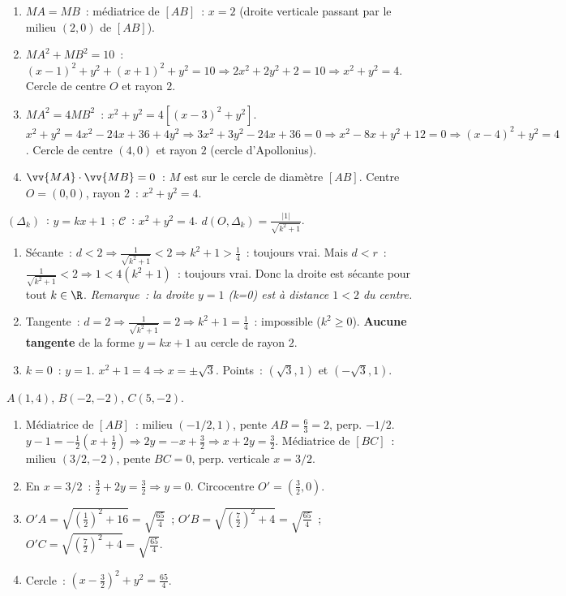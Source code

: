 
\begin{enumerate}
  \item $MA=MB$~: m\'ediatrice de $[AB]$~: $x=2$ (droite verticale passant par le milieu $(2,0)$ de $[AB]$).
  \item $MA^2+MB^2=10$~: $(x-1)^2+y^2+(x+1)^2+y^2=10\Rightarrow2x^2+2y^2+2=10\Rightarrow x^2+y^2=4$.
        Cercle de centre $O$ et rayon $2$.
  \item $MA^2=4MB^2$~: $x^2+y^2=4[(x-3)^2+y^2]$.
        $x^2+y^2=4x^2-24x+36+4y^2\Rightarrow3x^2+3y^2-24x+36=0\Rightarrow x^2-8x+y^2+12=0\Rightarrow(x-4)^2+y^2=4$.
        Cercle de centre $(4,0)$ et rayon $2$ (cercle d'Apollonius).
  \item $\vv{MA}\cdot\vv{MB}=0$~: $M$ est sur le cercle de diam\`etre $[AB]$.
        Centre $O=(0,0)$, rayon $2$~: $x^2+y^2=4$.
\end{enumerate}


$(\Delta_k)$~: $y=kx+1$~; $\mathcal{C}$~: $x^2+y^2=4$.
$d(O,\Delta_k)=\frac{|1|}{\sqrt{k^2+1}}$.
\begin{enumerate}
  \item S\'ecante~: $d<2\Rightarrow\frac{1}{\sqrt{k^2+1}}<2\Rightarrow k^2+1>\frac{1}{4}$~: toujours vrai.
        Mais $d<r$~: $\frac{1}{\sqrt{k^2+1}}<2\Rightarrow1<4(k^2+1)$~: toujours vrai.
        Donc la droite est s\'ecante pour tout $k\in\R$.
        \emph{Remarque~: la droite $y=1$ (k=0) est \`a distance $1<2$ du centre.}
  \item Tangente~: $d=2\Rightarrow\frac{1}{\sqrt{k^2+1}}=2\Rightarrow k^2+1=\frac{1}{4}$~: impossible ($k^2\geq0$).
        \textbf{Aucune tangente} de la forme $y=kx+1$ au cercle de rayon $2$.
  \item $k=0$~: $y=1$. $x^2+1=4\Rightarrow x=\pm\sqrt{3}$. Points~: $(\sqrt{3},1)$ et $(-\sqrt{3},1)$.
\end{enumerate}


$A(1,4)$, $B(-2,-2)$, $C(5,-2)$.
\begin{enumerate}
  \item M\'ediatrice de $[AB]$~: milieu $(-1/2,1)$, pente $AB=\frac{6}{3}=2$, perp. $-1/2$.
        $y-1=-\frac{1}{2}(x+\frac{1}{2})\Rightarrow2y=-x+\frac{3}{2}\Rightarrow x+2y=\frac{3}{2}$.
        M\'ediatrice de $[BC]$~: milieu $(3/2,-2)$, pente $BC=0$, perp. verticale $x=3/2$.
  \item En $x=3/2$~: $\frac{3}{2}+2y=\frac{3}{2}\Rightarrow y=0$. Circocentre $O'=(\frac{3}{2},0)$.
  \item $O'A=\sqrt{(\frac{1}{2})^2+16}=\sqrt{\frac{65}{4}}$~;
        $O'B=\sqrt{(\frac{7}{2})^2+4}=\sqrt{\frac{65}{4}}$~;
        $O'C=\sqrt{(\frac{7}{2})^2+4}=\sqrt{\frac{65}{4}}$.\checkmark
  \item Cercle~: $(x-\frac{3}{2})^2+y^2=\frac{65}{4}$.
\end{enumerate}


